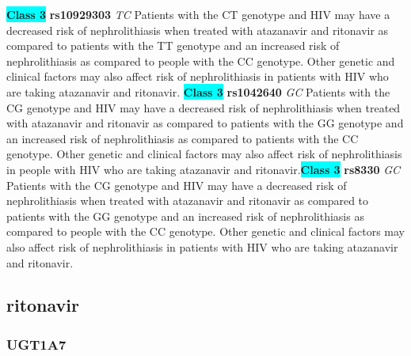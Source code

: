 \documentclass{book}
\begin{document}
\begin{center}
\textbf{\colorbox{cyan} {Class 3}} \textbf{ rs10929303 } \textit{ TC }
Patients with the CT genotype and HIV may have a decreased risk of nephrolithiasis when treated with atazanavir and ritonavir as compared to patients with the TT genotype and an increased risk of nephrolithiasis as compared to people with the CC genotype. Other genetic and clinical factors may also affect risk of nephrolithiasis in patients with HIV who are taking atazanavir and ritonavir. \textbf{\colorbox{cyan} {Class 3}} \textbf{ rs1042640 } \textit{ GC }
Patients with the CG genotype and HIV may have a decreased risk of nephrolithiasis when treated with atazanavir and ritonavir as compared to patients with the GG genotype and an increased risk of nephrolithiasis as compared to patients with the CC genotype. Other genetic and clinical factors may also affect risk of nephrolithiasis in people with HIV who are taking atazanavir and ritonavir.\textbf{\colorbox{cyan} {Class 3}} \textbf{ rs8330 } \textit{ GC }
Patients with the CG genotype and HIV may have a decreased risk of nephrolithiasis when treated with atazanavir and ritonavir as compared to patients with the GG genotype and an increased risk of nephrolithiasis as compared to people with the CC genotype. Other genetic and clinical factors may also affect risk of nephrolithiasis in patients with HIV who are taking atazanavir and ritonavir.


\end{center}\subsection{ ritonavir }


\subsubsection{ UGT1A7 }
\end{document}

